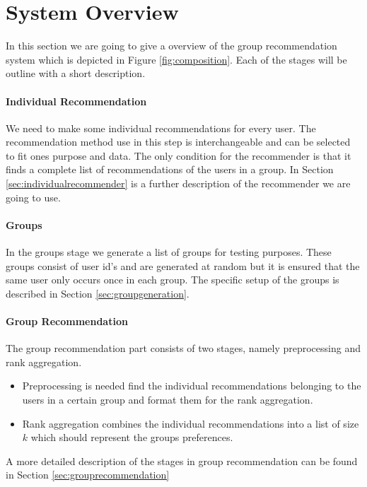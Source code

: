 \section{System Overview}\label{sec:systemoverview}
In this section we are going to give a overview of the group recommendation system which is depicted in Figure \ref{fig:composition}. Each of the stages will be outline with a short description. 

\paragraph{Individual Recommendation} We need to make some individual recommendations for every user. The recommendation method use in this step is interchangeable and can be selected to fit ones purpose and data. The only condition for the recommender is that it finds a complete list of recommendations of the users in a group. In Section \ref{sec:individualrecommender} is a further description of the recommender we are going to use.

\paragraph{Groups} In the groups stage we generate a list of groups for testing purposes. These groups consist of user id's and are generated at random but it is ensured that the same user only occurs once in each group. The specific setup of the groups is described in Section \ref{sec:groupgeneration}.

\paragraph{Group Recommendation} The group recommendation part consists of two stages, namely preprocessing and rank aggregation.
\begin{itemize}
\item Preprocessing is needed find the individual recommendations belonging to the users in a certain group and format them for the rank aggregation.
\item Rank aggregation combines the individual recommendations into a list of size $k$ which should represent the groups preferences.
\end{itemize}
A more detailed description of the stages in group recommendation can be found in Section \ref{sec:grouprecommendation} 

